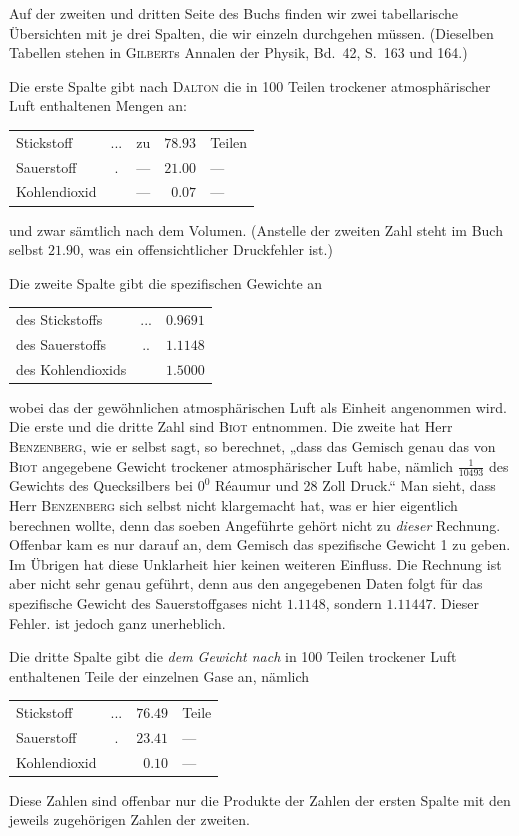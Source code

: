 Auf der zweiten und dritten Seite des Buchs finden wir zwei tabellarische Übersichten mit je drei Spalten, die wir einzeln durchgehen müssen. (Dieselben Tabellen stehen in \textsc{Gilbert}s Annalen der Physik, Bd.\ 42, S.\ 163 und 164.)

Die erste Spalte gibt nach \textsc{Dalton} die in 100 Teilen trockener atmosphärischer Luft enthaltenen Mengen an:
\begin{center}
\begin{tabular}{lclrl}
Stickstoff & .\quad .\quad . & zu & $78.93$ & Teilen\\
Sauerstoff & . & — & $21.00$ & —\\
Kohlendioxid & & — & $0.07$ & —
\end{tabular}
\end{center}
und zwar sämtlich nach dem Volumen. (Anstelle der zweiten Zahl steht im Buch selbst $21.90$, was ein offensichtlicher Druckfehler ist.)

Die zweite Spalte gibt die spezifischen Gewichte an
\begin{center}
\begin{tabular}{lcr}
des Stickstoffs & .\quad .\quad . & $0.9691$\\
des Sauerstoffs & .\quad . & $1.1148$\\
des Kohlendioxids & & $1.5000$
\end{tabular}
\end{center}
wobei das der gewöhnlichen atmosphärischen Luft als Einheit angenommen wird. Die erste und die dritte Zahl sind \textsc{Biot} entnommen. Die zweite hat Herr \textsc{Benzenberg}, wie er selbst sagt, so berechnet, „dass das Gemisch genau das von \textsc{Biot} angegebene Gewicht trockener atmosphärischer Luft habe, nämlich $\frac{1}{10493}$ des Gewichts des Quecksilbers bei $0^0$ Réaumur und 28 Zoll Druck.“ Man sieht, dass Herr \textsc{Benzenberg} sich selbst nicht klargemacht hat, was er hier eigentlich berechnen wollte, denn das soeben Angeführte gehört nicht zu \textit{dieser} Rechnung. Offenbar kam es nur darauf an,
dem Gemisch das spezifische Gewicht 1 zu geben. Im Übrigen hat diese Unklarheit hier keinen weiteren Einfluss. Die Rechnung ist aber nicht sehr genau geführt, denn aus den angegebenen Daten folgt für das spezifische Gewicht des Sauerstoffgases nicht $1.1148$, sondern $1.11447$. Dieser Fehler. ist jedoch ganz unerheblich.

Die dritte Spalte gibt die \textit{dem Gewicht nach} in 100 Teilen trockener Luft enthaltenen Teile der einzelnen Gase an, nämlich
\begin{center}\begin{tabular}{lcrl}
Stickstoff & .\quad .\quad . & $76.49$ & Teile\\
Sauerstoff & . & $23.41$ & —\\
Kohlendioxid & & $0.10$ & —
\end{tabular}\end{center}
Diese Zahlen sind offenbar nur die Produkte der Zahlen der ersten Spalte mit den jeweils zugehörigen Zahlen der zweiten.

